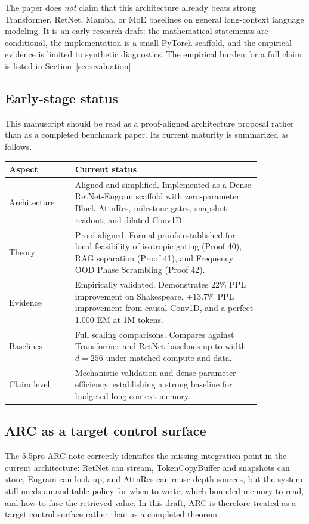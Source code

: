 \documentclass[11pt]{article}
\begin{document}
The paper does \emph{not} claim that this architecture already beats strong Transformer, RetNet, Mamba, or MoE baselines on general long-context language modeling. It is an early research draft: the mathematical statements are conditional, the implementation is a small PyTorch scaffold, and the empirical evidence is limited to synthetic diagnostics. The empirical burden for a full claim is listed in Section~\ref{sec:evaluation}.

\subsection{Early-stage status}

This manuscript should be read as a proof-aligned architecture proposal rather than as a completed benchmark paper. Its current maturity is summarized as follows.
\begin{center}
\begin{tabular}{p{0.22\linewidth}p{0.62\linewidth}}
\toprule
Aspect & Current status \\
\midrule
Architecture & Aligned and simplified. Implemented as a Dense RetNet-Engram scaffold with zero-parameter Block AttnRes, milestone gates, snapshot readout, and dilated Conv1D. \\
Theory & Proof-aligned. Formal proofs established for local feasibility of isotropic gating (Proof 40), RAG separation (Proof 41), and Frequency OOD Phase Scrambling (Proof 42). \\
Evidence & Empirically validated. Demonstrates 22\% PPL improvement on Shakespeare, +13.7\% PPL improvement from causal Conv1D, and a perfect 1.000 EM at 1M tokens. \\
Baselines & Full scaling comparisons. Compares against Transformer and RetNet baselines up to width $d=256$ under matched compute and data. \\
Claim level & Mechanistic validation and dense parameter efficiency, establishing a strong baseline for budgeted long-context memory. \\
\bottomrule
\end{tabular}
\end{center}

\subsection{ARC as a target control surface}

The 5.5pro ARC note correctly identifies the missing integration point in the
current architecture: RetNet can stream, TokenCopyBuffer and snapshots can store,
Engram can look up, and AttnRes can reuse depth sources, but the system still
needs an auditable policy for when to write, which bounded memory to read, and
how to fuse the retrieved value. In this draft, ARC is therefore treated as a
target control surface rather than as a completed theorem.
\end{document}
